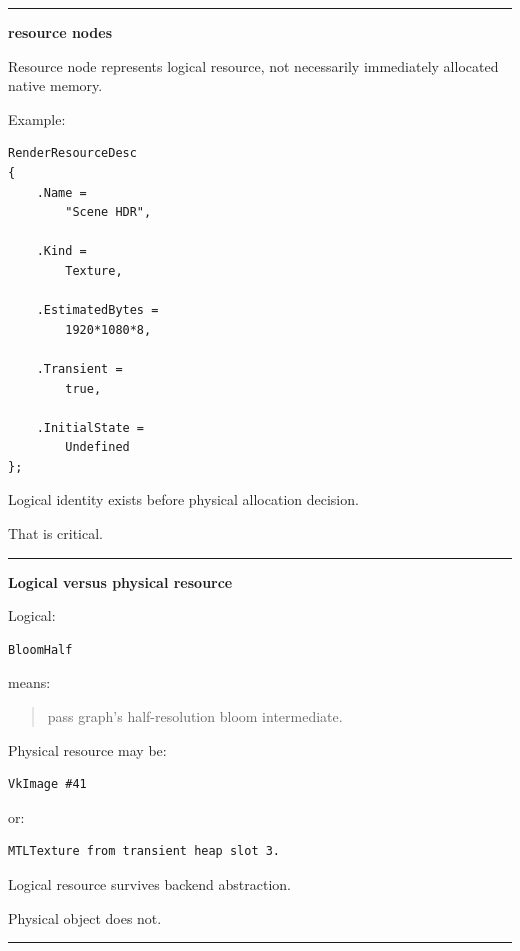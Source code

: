 \begin{center}\rule{0.5\linewidth}{0.5pt}\end{center}

\textbf{resource nodes}

Resource node represents logical resource, not necessarily immediately allocated native memory.

Example:

\begin{verbatim}
RenderResourceDesc
{
    .Name =
        "Scene HDR",

    .Kind =
        Texture,

    .EstimatedBytes =
        1920*1080*8,

    .Transient =
        true,

    .InitialState =
        Undefined
};
\end{verbatim}

Logical identity exists before physical allocation decision.

That is critical.

\begin{center}\rule{0.5\linewidth}{0.5pt}\end{center}

\textbf{Logical versus physical resource}

Logical:

\begin{verbatim}
BloomHalf
\end{verbatim}

means:

\begin{quote}
pass graph's half-resolution bloom intermediate.
\end{quote}

Physical resource may be:

\begin{verbatim}
VkImage #41
\end{verbatim}

or:

\begin{verbatim}
MTLTexture from transient heap slot 3.
\end{verbatim}

Logical resource survives backend abstraction.

Physical object does not.

\begin{center}\rule{0.5\linewidth}{0.5pt}\end{center}

